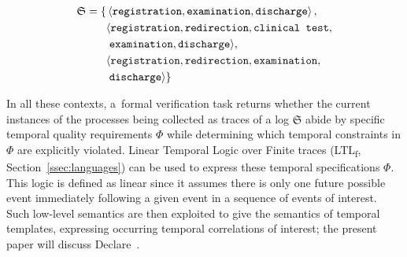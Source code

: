 \documentclass[information,article,accept,pdftex,oneauthor]{Definitions/mdpi}
\newcommand{\spec}{\ensuremath{\Phi}}
\newcommand{\LOG}{\ensuremath{\mathfrak{S}}}
\begin{document}
\begin{equation}\label{ourLog}
\begin{split}
\LOG=\{&\braket{\texttt{registration},\texttt{examination},\texttt{discharge}},\\
      &\langle\texttt{registration},\texttt{redirection},\texttt{clinical test},\\
      &\;\texttt{examination}, \texttt{discharge}  \rangle,\\
      &\langle\texttt{registration},\texttt{redirection},\texttt{examination},\\
      &\; \texttt{discharge}  \rangle\}\\
\end{split}
\end{equation}

 {In} %
 all these contexts, a~formal verification task returns whether the current instances of the processes being collected as traces of a log $\LOG$ abide by specific temporal quality requirements $\spec$ while determining which temporal constraints in $\spec$ are explicitly violated. Linear Temporal Logic over Finite traces (LTL\textsubscript{f}, Section~\ref{ssec:languages}) \cite{DBLP:conf/ijcai/GiacomoV13} can be used to express these temporal specifications $\spec$. This logic is defined as linear since it assumes there is only one future possible event immediately following a given event in a sequence of events of interest. Such low-level semantics are then exploited to give the semantics of temporal templates, expressing occurring temporal correlations of interest; the present paper will discuss Declare~\cite{4384001}. 
\end{document}
